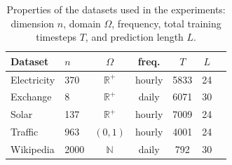 \documentclass[a4paper,10pt,twocolumn,preprint,3p]{elsarticle}
\begin{document}
\begin{table}
\centering
\small
\caption{Properties of the datasets used in the experiments: dimension \( n \), domain \( \Omega \), frequency, total training timesteps $T$, and prediction length $L$.}
\label{tab:dataset-details}
\begin{small}
\begin{tabular}{llccccc}
\toprule
Dataset & $n$ & $\Omega$ & freq. & $T$ & $L$\\
\midrule
Electricity  & 370 & $\mathbb{R}^+$ & hourly & 5833 & 24\\
Exchange & 8 & $\mathbb{R}^+$ & daily & 6071 & 30 \\
Solar & 137 & $\mathbb{R}^+$ & hourly & 7009 & 24 \\
Traffic & 963 & $(0,1)$ & hourly & 4001 & 24\\
Wikipedia & 2000 & $\mathbb{N}$ & daily & 792 & 30\\
\bottomrule
\end{tabular}
\end{small}
\end{table}
\end{document}

